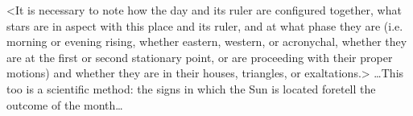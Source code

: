\mndl <It is necessary to note how the day and its ruler are configured together, what stars are in aspect with this place and its ruler, and at what phase they are (i.e. morning or evening rising, whether eastern,
western, or acronychal, whether they are at the first or second stationary point, or are proceeding with their proper motions) and whether they are in their houses, triangles, or exaltations.>
…This too is a scientific method: the signs in which the Sun is located foretell the outcome of the month…


\newpage